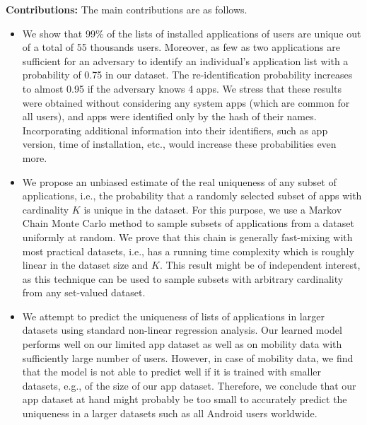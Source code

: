 \documentclass{acm_proc_article-sp}
\theoremstyle{plain}
\theoremstyle{plain}
\theoremstyle{plain}
\theoremstyle{plain}
\theoremstyle{plain}
\theoremstyle{plain}
\begin{document}
\textbf{Contributions:} The main contributions are as follows.
\begin{itemize}
\item We show that 99\% of the lists of installed applications of users are unique out of a total of 55 thousands users. 
Moreover, as few as two applications are sufficient for an adversary to identify an individual's application list with a probability of 0.75 in our dataset. 
The re-identification probability increases to almost 0.95 if the adversary knows 4 apps.
We stress that these results were obtained without considering any system apps (which are common for all users), and apps were identified only by the hash of their names.
Incorporating additional information into their identifiers, such as app version, time of installation, etc., would increase these probabilities even more. 

\item We propose an unbiased estimate of the real uniqueness of any subset of applications, i.e., the probability that a randomly selected subset of apps with cardinality $K$ is unique in the dataset. 
For this purpose, we use a Markov Chain Monte Carlo method to sample subsets of applications from a dataset uniformly at random. 
We prove that this chain is generally fast-mixing with most practical datasets, i.e., has a running time complexity which is roughly linear in the dataset size and $K$. 
This result might be of independent interest, as this technique can be used to sample subsets with arbitrary cardinality from any set-valued dataset. 

\item We attempt to predict the uniqueness of lists of applications in larger datasets using standard non-linear regression analysis. 
Our learned model performs well on our limited app dataset as well as on mobility data with sufficiently large number of users.
However, in case of mobility data, we find that the model is not able to predict well if it is trained with smaller datasets, e.g., of the size of our app dataset.
Therefore, we conclude that our app dataset at hand might probably be too small to accurately predict the uniqueness in a larger datasets such as all Android users worldwide. 
\end{itemize}







 
\end{document}
